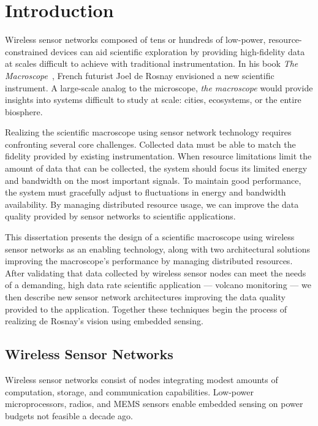 \chapter{Introduction}
\label{chap-introduction}

Wireless sensor networks composed of tens or hundreds of low-power,
resource-constrained devices can aid scientific exploration by providing
high-fidelity data at scales difficult to achieve with traditional
instrumentation. In his book \textit{The Macroscope}~\cite{rosnay79}, French
futurist Joel de Rosnay envisioned a new scientific instrument. A large-scale
analog to the microscope, \textit{the macroscope} would provide insights into
systems difficult to study at scale: cities, ecosystems, or the entire
biosphere.

Realizing the scientific macroscope using sensor network technology requires
confronting several core challenges. Collected data must be able to match the
fidelity provided by existing instrumentation. When resource limitations
limit the amount of data that can be collected, the system should focus its
limited energy and bandwidth on the most important signals. To maintain good
performance, the system must gracefully adjust to fluctuations in energy and
bandwidth availability. By managing distributed resource usage, we can
improve the data quality provided by sensor networks to scientific
applications.

\clearpage

This dissertation presents the design of a scientific macroscope using
wireless sensor networks as an enabling technology, along with two
architectural solutions improving the macroscope's performance by managing
distributed resources. After validating that data collected by wireless
sensor nodes can meet the needs of a demanding, high data rate scientific
application --- volcano monitoring --- we then describe new sensor network
architectures improving the data quality provided to the application.
Together these techniques begin the process of realizing de Rosnay's vision
using embedded sensing.

\section{Wireless Sensor Networks}

Wireless sensor networks consist of nodes integrating modest amounts of
computation, storage, and communication capabilities. Low-power
microprocessors, radios, and MEMS sensors enable embedded sensing on power
budgets not feasible a decade ago.

